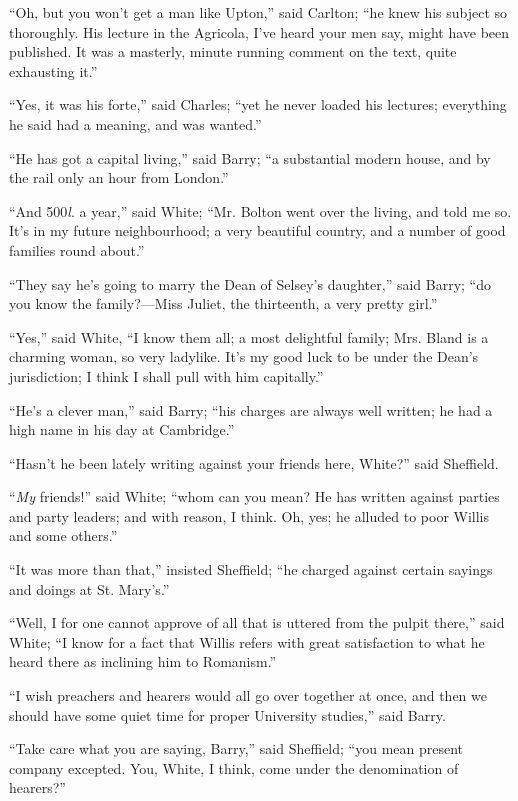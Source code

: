 ``Oh, but you won't get a man like Upton,'' said Carlton;
``he knew his subject so thoroughly. His lecture in the Agricola,
I've heard your men say, might have been published. It was a masterly,
minute running comment on the text, quite exhausting it.''

``Yes, it was his forte,'' said Charles; ``yet he never
loaded his lectures; everything he said had a meaning, and was
wanted.''

``He has got a capital living,'' said Barry; ``a
substantial modern house, and by the rail only an hour from
London.''

``And 500\emph{l}. a year,'' said White; ``Mr. Bolton
went over the living, and told me so. It's in my future neighbourhood;
a very beautiful country, and a number of good families round
about.''

``They say he's going to marry the Dean of Selsey's
daughter,'' said Barry; ``do you know the family?—Miss
Juliet, the thirteenth, a very pretty girl.''

``Yes,'' said White, ``I know them all; a most
delightful family; Mrs. Bland is a charming woman, so very ladylike.
It's my good luck to be under the Dean's jurisdiction; I think I shall
pull with him capitally.''

``He's a clever man,'' said Barry; ``his charges are
always well written; he had a high name in his day at Cambridge.''

``Hasn't he been lately writing against your friends here,
White?'' said Sheffield.

``\emph{My} friends!'' said White; ``whom can you mean?
He has written against parties and party leaders; and with reason, I
think. Oh, yes; he alluded to poor Willis and some others.''

``It was more than that,'' insisted Sheffield; ``he
charged against certain sayings and doings at St. Mary's.''

``Well, I for one cannot approve of all that is uttered from
the pulpit there,'' said White; ``I know for a fact that
Willis refers with great satisfaction to what he heard there as
inclining him to Romanism.''

``I wish preachers and hearers would all go over together at
once, and then we should have some quiet time for proper University
studies,'' said Barry.

``Take care what you are saying, Barry,'' said Sheffield;
``you mean present company excepted. You, White, I think, come
under the denomination of hearers?''

